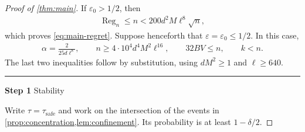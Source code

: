 \documentclass[11pt]{article}
\newcommand{\proofstep}[2]{%
    \par\medskip
    \noindent
    \textcolor{blue!55!black}{\rule{2pt}{1.2em}}%
    \hspace{0.6em}%
    {\sffamily\bfseries\color{blue!55!black}Step #1}%
    \quad
    {\sffamily #2}%
    \par\smallskip
}
\newcommand{\1}{\mathbf 1}
\newcommand{\eps}{\varepsilon}
\begin{document}
\begin{proof}[Proof of \cref{thm:main}]
    If $\eps_0>1/2$, then
    \begin{align}
        \operatorname{Reg}_n\leq n
        <200d^2M\ell^8\sqrt n,
    \end{align}
    which proves \eqref{eq:main-regret}. Suppose henceforth that
    $\eps=\eps_0\leq1/2$. In this case,
    \begin{align}
        \alpha=\frac{2}{25d\ell^8},
        \qquad
        n\geq4\cdot10^4d^4M^2\ell^{16},
        \qquad
        32BV\leq n,
        \qquad k<n.
        \label{eq:active-horizon}
    \end{align}
    The last two inequalities follow by substitution, using
    $dM^2\geq1$ and $\ell\geq640$.

    \proofstep{1}{Stability}
    Write $\tau=\tau_{\mathrm{safe}}$ and work on the intersection of the
    events in \cref{prop:concentration,lem:confinement}. Its probability
    is at least $1-\delta/2$.


\end{proof}
\end{document}
